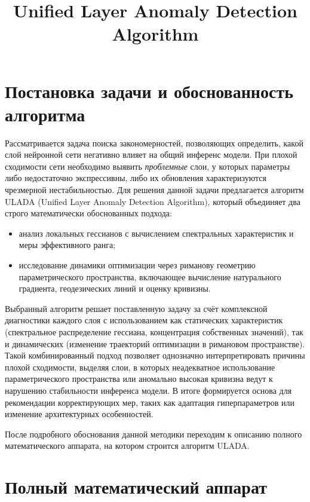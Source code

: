 \documentclass[a4paper,12pt]{article}
\title{\textbf{Unified Layer Anomaly Detection Algorithm}}
\author{ }
\date{}
\begin{document}
\maketitle

\section{Постановка задачи и обоснованность алгоритма}

Рассматривается задача поиска закономерностей, позволяющих определить, какой слой нейронной сети негативно влияет на общий инференс модели. При плохой сходимости сети необходимо выявить \emph{проблемные} слои, у которых параметры либо недостаточно экспрессивны, либо их обновления характеризуются чрезмерной нестабильностью. Для решения данной задачи предлагается алгоритм ULADA (Unified Layer Anomaly Detection Algorithm), который объединяет два строго математически обоснованных подхода:
\begin{itemize}[leftmargin=1.0cm]
    \item анализ локальных гессианов с вычислением спектральных характеристик и меры эффективного ранга;
    \item исследование динамики оптимизации через риманову геометрию параметрического пространства, включающее вычисление натурального градиента, геодезических линий и оценку кривизны.
\end{itemize}

Выбранный алгоритм решает поставленную задачу за счёт комплексной диагностики каждого слоя с использованием как статических характеристик (спектральное распределение гессиана, концентрация собственных значений), так и динамических (изменение траекторий оптимизации в римановом пространстве). Такой комбинированный подход позволяет однозначно интерпретировать причины плохой сходимости, выделяя слои, в которых неадекватное использование параметрического пространства или аномально высокая кривизна ведут к нарушению стабильности инференса модели. В итоге формируется основа для рекомендации корректирующих мер, таких как адаптация гиперпараметров или изменение архитектурных особенностей.

После подробного обоснования данной методики переходим к описанию полного математического аппарата, на котором строится алгоритм ULADA.

\bigskip

\section{Полный математический аппарат}
\end{document}
